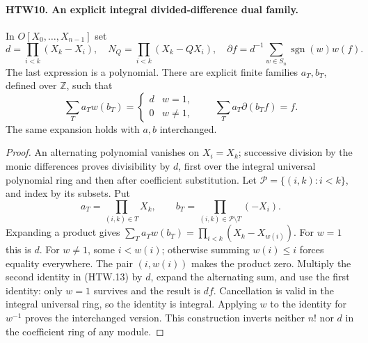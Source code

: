 \paragraph{HTW10. An explicit integral divided-difference dual family.}
\label{claim:HTW10}
In \(O[X_0,\ldots,X_{n-1}]\) set
\[
 d=\prod_{i<k}(X_k-X_i),\quad
 N_Q=\prod_{i<k}(X_k-QX_i),\quad
 \partial f=d^{-1}\sum_{w\in S_n}\operatorname{sgn}(w)w(f).
 \tag{HTW.12}
\]
The last expression is a polynomial.  There are explicit
finite families \(a_T,b_T\), defined over \(\mathbb Z\),
such that
\[
 \sum_T a_Tw(b_T)=
     \begin{cases}d&w=1,\\0&w\ne1,\end{cases}
 \qquad
 \sum_T a_T\partial(b_Tf)=f .
 \tag{HTW.13}
\]
The same expansion holds with \(a,b\) interchanged.
\begin{proof}
An alternating polynomial vanishes on \(X_i=X_k\);
successive division by the monic differences proves
divisibility by \(d\), first over the integral universal
polynomial ring and then after coefficient substitution.
Let \(\mathcal P=\{(i,k):i<k\}\), and index by its subsets.
Put
\[
 a_T=\prod_{(i,k)\in T}X_k,\qquad
 b_T=\prod_{(i,k)\in\mathcal P\setminus T}(-X_i).
\]
Expanding a product gives
\(\sum_Ta_Tw(b_T)=\prod_{i<k}(X_k-X_{w(i)})\).
For \(w=1\) this is \(d\).
For \(w\ne1\), some \(i<w(i)\); otherwise summing
\(w(i)\le i\) forces equality everywhere.  The pair
\((i,w(i))\) makes the product zero.
Multiply the second identity in (HTW.13) by \(d\),
expand the alternating sum, and use the first identity:
only \(w=1\) survives and the result is \(df\).
Cancellation is valid in the integral universal ring,
so the identity is integral.  Applying \(w\) to the
identity for \(w^{-1}\) proves the interchanged version.
This construction inverts neither \(n!\) nor \(d\)
in the coefficient ring of any module.
\end{proof}

